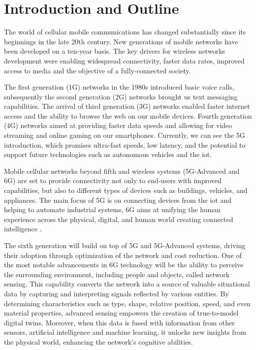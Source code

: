 \chapter{Introduction and Outline}
\label{chap_intro}

The world of cellular mobile communications has changed substantially since its beginnings in the late 20th century.
New generations of mobile networks have been developed on a ten-year basis. The key drivers for wireless networks development were enabling widespread connectivity, faster data rates, improved access to media and the objective of a fully-connected society.

The first generation (1G) networks in the 1980s introduced basic voice calls, subsequently the second generation (2G) networks brought us text messaging capabilities. The arrival of third generation (3G) networks enabled faster internet access and the ability to browse the web on our mobile devices. 
Fourth generation (4G) networks aimed at providing faster data speeds and allowing for video streaming and online gaming on our smartphones. 
Currently, we can see the \gls{5G} introduction, which promises ultra-fast speeds, low latency, and the potential to support future technologies such as autonomous vehicles and the \gls{iot}. 

Mobile cellular networks beyond fifth and wireless systems (\gls{5G}-Advanced and 6G) are set to provide connectivity not only to end-users with improved capabilities, but also to different types of devices such as buildings, vehicles, and appliances.
The main focus of \gls{5G} is on connecting devices from the \gls{iot} and helping to automate industrial systems, 6G aims at unifying the human experience across the physical, digital, and human world creating connected intelligence \cite{6G-explained-NOKIA}.


The sixth generation will build on top of \gls{5G} and \gls{5G}-Advanced systems, driving their adoption through optimization of the network and cost reduction. 
One of the most notable advancements in 6G technology will be the ability to perceive the surrounding environment, including people and objects, called network sensing. This capability converts the network into a source of valuable situational data by capturing and interpreting signals reflected by various entities. 
By determining characteristics such as type, shape, relative position, speed, and even material properties, advanced sensing empowers the creation of true-to-model digital twins.
Moreover, when this data is fused with information from other sensors, artificial intelligence and machine learning, it unlocks new insights from the physical world, enhancing the network's cognitive abilities.


